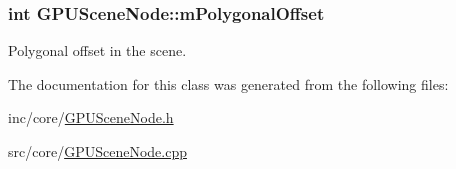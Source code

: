 \hypertarget{class_g_p_u_scene_node_a4625ba124b15ebd9159a633b57c98165}{
\subsubsection[{m\+Polygonal\+Offset}]{\setlength{\rightskip}{0pt plus 5cm}int G\+P\+U\+Scene\+Node\+::m\+Polygonal\+Offset\hspace{0.3cm}{\ttfamily [private]}}}\label{class_g_p_u_scene_node_a4625ba124b15ebd9159a633b57c98165}


Polygonal offset in the scene. 



The documentation for this class was generated from the following files\+:\begin{DoxyCompactItemize}
\item 
inc/core/\hyperlink{_g_p_u_scene_node_8h}{G\+P\+U\+Scene\+Node.\+h}\item 
src/core/\hyperlink{_g_p_u_scene_node_8cpp}{G\+P\+U\+Scene\+Node.\+cpp}\end{DoxyCompactItemize}
